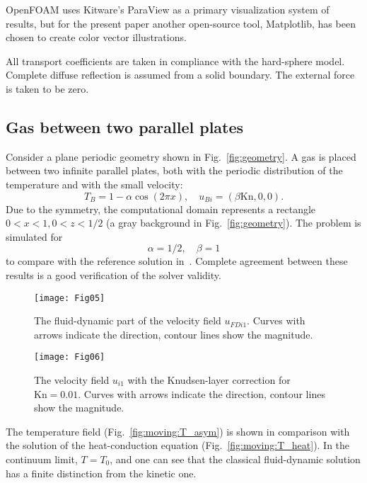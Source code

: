 \documentclass[smallextended, final]{svjour3} %
\newcommand{\Kn}{\mathrm{Kn}}
\begin{document}
OpenFOAM\textregistered{} uses Kitware's ParaView\textregistered{} as a primary visualization system of results,
but for the present paper another open-source tool, Matplotlib, has been chosen to create color vector illustrations.

All transport coefficients are taken in compliance with the hard-sphere model.
Complete diffuse reflection is assumed from a solid boundary.
The external force is taken to be zero.

\subsection{Gas between two parallel plates}

Consider a plane periodic geometry shown in Fig.~\ref{fig:geometry}.
A gas is placed between two infinite parallel plates,
both with the periodic distribution of the temperature and with the small velocity:
\begin{equation}
    T_B = 1-\alpha\cos(2\pi x), \quad u_{Bi} = (\beta\Kn,0,0).
\end{equation}
Due to the symmetry, the computational domain represents a rectangle \(0<x<1, 0<z<1/2\)
(a gray background in Fig.~\ref{fig:geometry}).
The problem is simulated for
\[ \alpha=1/2, \quad \beta = 1 \]
to compare with the reference solution in~\cite{SoneBobylev96}.
Complete agreement between these results is a good verification of the solver validity.

\begin{figure}
    \centering
    \texttt{[image: Fig05]}
    \caption{The fluid-dynamic part of the velocity field \(u_{FDi1}\).
        Curves with arrows indicate the direction, contour lines show the magnitude.}
    \label{fig:moving:fluid}
\end{figure}

\begin{figure}
    \centering
    \texttt{[image: Fig06]}
    \caption{The velocity field \(u_{i1}\) with the Knudsen-layer correction for \(\Kn=0.01\).
        Curves with arrows indicate the direction, contour lines show the magnitude.}
    \label{fig:moving:kn001}
\end{figure}

The temperature field (Fig.~\ref{fig:moving:T_asym}) is shown
in comparison with the solution of the heat-conduction equation (Fig.~\ref{fig:moving:T_heat}).
In the continuum limit, \(T=T_0\), and one can see that the classical fluid-dynamic solution
has a finite distinction from the kinetic one.
\end{document}
